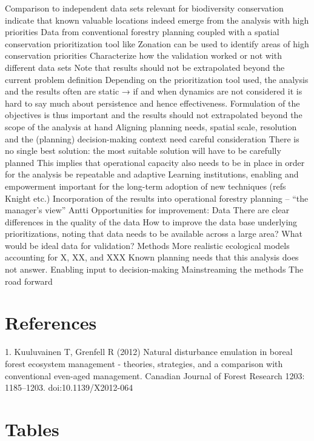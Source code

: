 \documentclass[]{article}
\begin{document}
Comparison to independent data sets relevant for biodiversity
conservation indicate that known valuable locations indeed emerge from
the analysis with high priorities Data from conventional forestry
planning coupled with a spatial conservation prioritization tool like
Zonation can be used to identify areas of high conservation priorities
Characterize how the validation worked or not with different data sets
Note that results should not be extrapolated beyond the current problem
definition Depending on the prioritization tool used, the analysis and
the results often are static → if and when dynamics are not considered
it is hard to say much about persistence and hence effectiveness.
Formulation of the objectives is thus important and the results should
not extrapolated beyond the scope of the analysis at hand Aligning
planning needs, spatial scale, resolution and the (planning)
decision-making context need careful consideration There is no single
best solution: the most suitable solution will have to be carefully
planned This implies that operational capacity also needs to be in place
in order for the analysis be repeatable and adaptive Learning
institutions, enabling and empowerment important for the long-term
adoption of new techniques (refs Knight etc.) Incorporation of the
results into operational forestry planning -- ``the manager's view''
Antti Opportunities for improvement: Data There are clear differences in
the quality of the data How to improve the data base underlying
prioritizations, noting that data needs to be available across a large
area? What would be ideal data for validation? Methods More realistic
ecological models accounting for X, XX, and XXX Known planning needs
that this analysis does not answer. Enabling input to decision-making
Mainstreaming the methods The road forward

\section{References}

1. Kuuluvainen T, Grenfell R (2012) Natural disturbance emulation in
boreal forest ecosystem management - theories, strategies, and a
comparison with conventional even-aged management. Canadian Journal of
Forest Research 1203: 1185--1203. doi:10.1139/X2012-064

\section{Tables}
\end{document}
